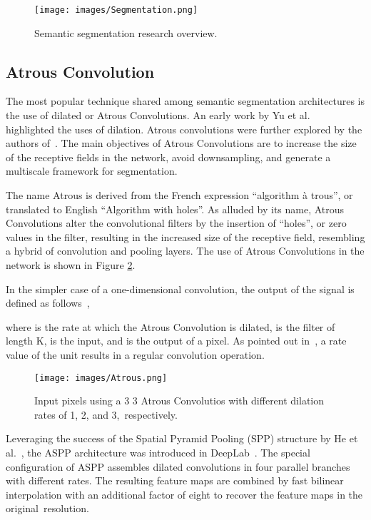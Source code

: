\documentclass[sensors,article,accept,moreauthors,pdftex]{Definitions/mdpi}
\begin{document}
\begin{figure}[H]
\centering
\texttt{[image: images/Segmentation.png]}
\caption{Semantic segmentation research overview.}   \label{fig:Segmentation}
\end{figure}

\subsection{Atrous Convolution}
The most popular technique shared among semantic segmentation architectures is the use of dilated or Atrous Convolutions. An early work by Yu et al.~\cite{DilatedConv} highlighted the uses of dilation.
Atrous convolutions were further explored by the authors of~\cite{DeepLab,Rethinking,DeepLabv3+,Enet}. The main objectives of Atrous Convolutions are to increase the size of the receptive fields in the network, avoid downsampling, and generate a multiscale framework for segmentation.

The name Atrous is derived from the French expression ``algorithm \`a trous'', or translated to English ``Algorithm with holes''. As alluded by its name, Atrous Convolutions alter the convolutional filters by the insertion of ``holes'', or zero values in the filter, resulting in the increased size of the receptive field, resembling a hybrid of convolution and pooling layers.
The use of Atrous Convolutions in the network is shown in Figure \ref{fig:Atrous}.

In the simpler case of a one-dimensional convolution, the output of the signal is defined as follows~\cite{DeepLab},

where  is the rate at which the Atrous Convolution is dilated,  is the filter of length K,  is the input, and  is the output of a pixel. As pointed out in~\cite{DeepLab}, a rate value of the unit results in a regular convolution operation.

\begin{figure}[H]
\centering
\texttt{[image: images/Atrous.png]}
\caption{Input pixels using a 3  3 Atrous Convolutios with different dilation rates of 1, 2, and 3,~respectively.}
\label{fig:Atrous}
\end{figure}

Leveraging the success of the Spatial Pyramid Pooling (SPP) structure by He et al.~\cite{SPP}, the ASPP architecture was introduced in DeepLab~\cite{DeepLab}.
The special configuration of ASPP assembles dilated convolutions in four parallel branches with different rates. The resulting feature maps are combined by fast bilinear interpolation with an additional factor of eight to recover the feature maps in the original~resolution.
\end{document}
